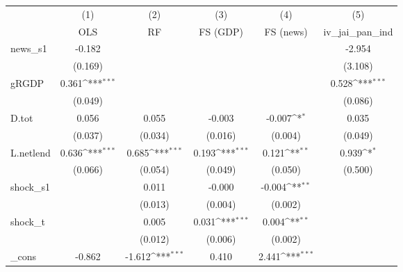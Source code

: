 {
\def\sym#1{\ifmmode^{#1}\else\(^{#1}\)\fi}
\begin{tabular}{l*{5}{c}}
\toprule
            &\multicolumn{1}{c}{(1)}&\multicolumn{1}{c}{(2)}&\multicolumn{1}{c}{(3)}&\multicolumn{1}{c}{(4)}&\multicolumn{1}{c}{(5)}\\
            &\multicolumn{1}{c}{OLS}&\multicolumn{1}{c}{RF}&\multicolumn{1}{c}{FS (GDP)}&\multicolumn{1}{c}{FS (news)}&\multicolumn{1}{c}{iv\_jai\_pan\_ind}\\
\midrule
news\_s1     &      -0.182         &                     &                     &                     &      -2.954         \\
            &     (0.169)         &                     &                     &                     &     (3.108)         \\
\addlinespace
gRGDP       &       0.361\sym{***}&                     &                     &                     &       0.528\sym{***}\\
            &     (0.049)         &                     &                     &                     &     (0.086)         \\
\addlinespace
D.tot       &       0.056         &       0.055         &      -0.003         &      -0.007\sym{*}  &       0.035         \\
            &     (0.037)         &     (0.034)         &     (0.016)         &     (0.004)         &     (0.049)         \\
\addlinespace
L.netlend   &       0.636\sym{***}&       0.685\sym{***}&       0.193\sym{***}&       0.121\sym{**} &       0.939\sym{*}  \\
            &     (0.066)         &     (0.054)         &     (0.049)         &     (0.050)         &     (0.500)         \\
\addlinespace
shock\_s1    &                     &       0.011         &      -0.000         &      -0.004\sym{**} &                     \\
            &                     &     (0.013)         &     (0.004)         &     (0.002)         &                     \\
\addlinespace
shock\_t     &                     &       0.005         &       0.031\sym{***}&       0.004\sym{**} &                     \\
            &                     &     (0.012)         &     (0.006)         &     (0.002)         &                     \\
\addlinespace
\_cons      &      -0.862         &      -1.612\sym{***}&       0.410         &       2.441\sym{***}&                     \\

\end{tabular}}
